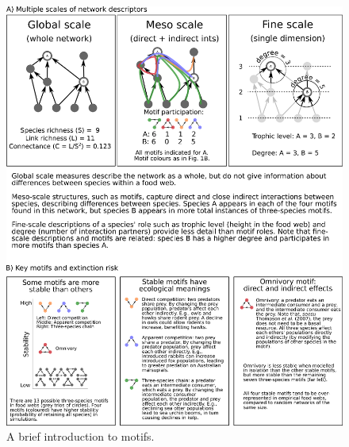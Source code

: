 \documentclass[12pt]{article}
\begin{document}


    \begin{figure}[ht!]
        \includegraphics[width=.9\textwidth]{figures/motifs_box.eps}
        \caption{A brief introduction to motifs.}
        \label{motifs}
    \end{figure}

    \clearpage
\end{document}
